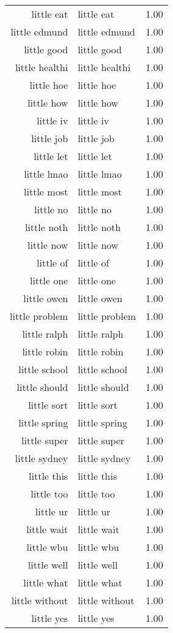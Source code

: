 \begin{table}[ht]
\begin{tabular}{rlr}
  little eat & little eat & 1.00 \\ 
  little edmund & little edmund & 1.00 \\ 
  little good & little good & 1.00 \\ 
  little healthi & little healthi & 1.00 \\ 
  little hoe & little hoe & 1.00 \\ 
  little how & little how & 1.00 \\ 
  little iv & little iv & 1.00 \\ 
  little job & little job & 1.00 \\ 
  little let & little let & 1.00 \\ 
  little lmao & little lmao & 1.00 \\ 
  little most & little most & 1.00 \\ 
  little no & little no & 1.00 \\ 
  little noth & little noth & 1.00 \\ 
  little now & little now & 1.00 \\ 
  little of & little of & 1.00 \\ 
  little one & little one & 1.00 \\ 
  little owen & little owen & 1.00 \\ 
  little problem & little problem & 1.00 \\ 
  little ralph & little ralph & 1.00 \\ 
  little robin & little robin & 1.00 \\ 
  little school & little school & 1.00 \\ 
  little should & little should & 1.00 \\ 
  little sort & little sort & 1.00 \\ 
  little spring & little spring & 1.00 \\ 
  little super & little super & 1.00 \\ 
  little sydney & little sydney & 1.00 \\ 
  little this & little this & 1.00 \\ 
  little too & little too & 1.00 \\ 
  little ur & little ur & 1.00 \\ 
  little wait & little wait & 1.00 \\ 
  little wbu & little wbu & 1.00 \\ 
  little well & little well & 1.00 \\ 
  little what & little what & 1.00 \\ 
  little without & little without & 1.00 \\ 
  little yes & little yes & 1.00 \\ 
   \hline
\end{tabular}
\end{table}
